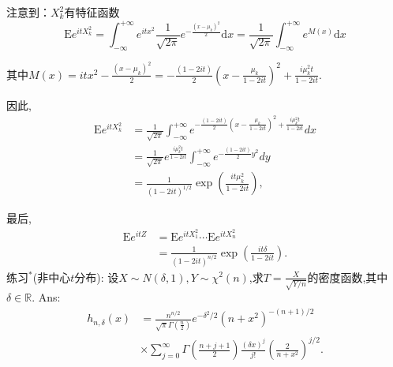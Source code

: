 	\begin{frame}
		注意到：$X_{k}^{2}$有特征函数
		\begin{equation}
			\mathrm{E}e^{itX_{k}^{2}}=\int_{-\infty }^{+\infty}{{{e}^{it{{x}^{2}}}}\frac{1}{\sqrt{2\pi }}{{e}^{-\frac{{{(x-{{\mu }_{k}})}^{2}}}{2}}}\mathrm{d}x}=\frac{1}{\sqrt{2\pi }}\int_{-\infty }^{+\infty }{{{e}^{M(x)}}\mathrm{d}x}
		\end{equation}
		
		其中$M(x)=it{{x}^{2}}-\frac{{{(x-{{\mu }_{k}})}^{2}}}{2}=-\frac{(1-2it)}{2}{{(x-\frac{{{\mu }_{k}}}{1-2it})}^{2}}+\frac{i\mu _{k}^{2}t}{1-2it}.$ 
		
		因此,
		\begin{equation}
			\begin{split}
					\mathrm{E}e^{itX_{k}^{2}} &=\frac{1}{\sqrt{2\pi }}\int_{-\infty }^{+\infty }{{{e}^{-\frac{(1-2it)}{2}{{(x-\frac{{{\mu }_{k}}}{1-2it})}^{2}}+\frac{i\mu _{k}^{2}t}{1-2it}}}dx} \\
					&=\frac{1}{\sqrt{2\pi }}{{e}^{\frac{i\mu _{k}^{2}t}{1-2it}}}\int_{-\infty }^{+\infty }{{{e}^{-\frac{(1-2it)}{2}{{y}^{2}}}}dy} \\
					&=\frac{1}{{{(1-2it)}^{1/2}}}\exp \left( \frac{it\mu _{k}^{2}}{1-2it} \right),
			\end{split}
		\end{equation}
		
	\end{frame}

	\begin{frame}
		最后,
		\begin{equation}
			\begin{split}
				\mathrm{E}e^{itZ} &= \mathrm{E}e^{itX_1^2}\cdots\mathrm{E}e^{itX_n^2} \\
				&= \frac{1}{{{(1-2it)}^{n/2}}}\exp \left( \frac{it\delta}{1-2it} \right).
			\end{split}
		\end{equation}
		练习$^*$(非中心$t$分布): 设$X\sim N(\delta,1),Y\sim \chi^2(n)$,求$T = \frac{X}{\sqrt{Y/n}}$的密度函数,其中$\delta\in\mathbb{R}$.
		Ans:
		\begin{equation}
			\begin{split}
				h_{n,\delta}(x) &= \frac{n^{n/2}}{\sqrt{\pi}\Gamma(\frac{n}{2})}e^{-\delta^2/2}(n+x^2)^{-(n+1)/2} \\
				&\times \sum_{j=0}^{\infty}\Gamma(\frac{n+j+1}{2})\frac{(\delta x)^j}{j!}(\frac{2}{n+x^2})^{j/2}.
			\end{split}
		\end{equation}
	\end{frame}

